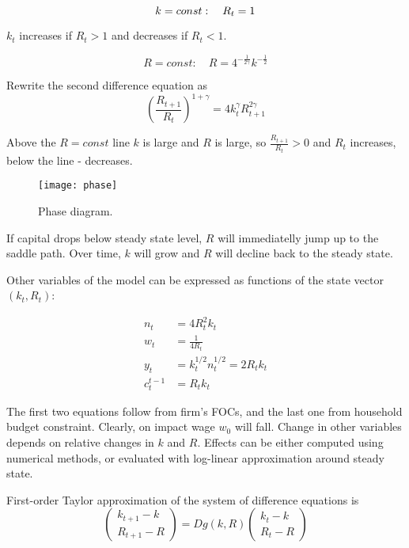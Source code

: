 \documentclass{article}
\begin{document}
\begin{enumerate}
\begin{equation*}
k=const:\quad R_t=1\\
\end{equation*}

$k_t$ increases if $R_t>1$ and decreases if $R_t<1$.

\begin{equation*}
R=const:\quad R=4^{-\frac{1}{2\gamma}}k^{-\frac{1}{2}}
\end{equation*}

Rewrite the second difference equation as
\begin{equation*}
  \left(\frac{R_{t+1}}{R_t}\right)^{1+\gamma}=4k_t^\gamma R_{t+1}^{2\gamma}
\end{equation*}

Above the $R=const$ line $k$ is large and $R$ is large, so
$\frac{R_{t+1}}{R_t}>0$ and $R_t$ increases, below the line -
decreases.

\begin{figure}[h]
  \begin{center}
    \texttt{[image: phase]}
  \end{center}
  \caption{Phase diagram.}
\end{figure}

If capital drops below steady state level, $R$ will immediatelly jump
up to the saddle path. Over time, $k$ will grow and $R$ will decline
back to the steady state.

Other variables of the model can be expressed as functions of the
state vector $(k_t,R_t)$:

\begin{align*}
  n_t&=4R_t^2k_t\\
  w_t&=\frac{1}{4R_t}\\
  y_t&=k_{t}^{1/2}n_{t}^{1/2}=2R_tk_t\\
  c_t^{t-1}&=R_tk_t
\end{align*}

The first two equations follow from firm's FOCs, and the last one from
household budget constraint. Clearly, on impact wage $w_0$ will
fall. Change in other variables depends on relative changes in $k$ and
$R$. Effects can be either computed using numerical methods, or
evaluated with log-linear approximation around steady state.

First-order Taylor approximation of the system of difference equations is
\begin{equation*}
  \begin{pmatrix}
    k_{t+1}-k\\
    R_{t+1}-R
  \end{pmatrix}
= Dg(k,R)  \begin{pmatrix}
    k_{t}-k\\
    R_{t}-R
  \end{pmatrix}
\end{equation*}


\end{enumerate}
\end{document}
